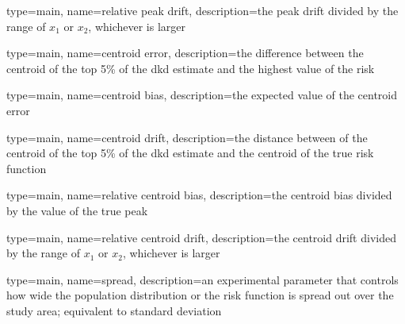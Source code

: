 {%
   type=main,
   name={relative peak drift},
   description={the \gls{peak drift} divided by the range of \ensuremath{x_1} or \ensuremath{x_2}, whichever is larger}
}

{%
   type=main,
   name={centroid error},
   description={the difference between the centroid of the top 5\% of the dkd estimate and the highest value of the risk}
}

{%
   type=main,
   name={centroid bias},
   description={the expected value of the centroid error}
}

{%
   type=main,
   name={centroid drift},
   description={the distance between of the centroid of the top 5\% of the dkd estimate and the centroid of the true risk function}
}

{%
   type=main,
   name={relative centroid bias},
   description={the \gls{centroid bias} divided by the value of the true peak}
}

{%
   type=main,
   name={relative centroid drift},
   description={the \gls{centroid drift} divided by the range of \ensuremath{x_1} or \ensuremath{x_2}, whichever is larger}
}

{
   type=main,
   name={spread},
   description={an experimental parameter that controls how wide the population distribution or the risk function is spread out over the study area; equivalent to standard deviation}
}


